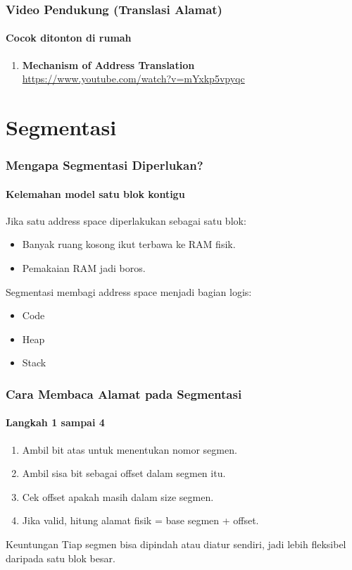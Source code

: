 \documentclass[t,aspectratio=169,xcolor=dvipsnames]{beamer}
\begin{document}
\begin{frame}
    \frametitle{Video Pendukung (Translasi Alamat)}
    \framesubtitle{Cocok ditonton di rumah}
    \small
    \begin{enumerate}
        \item \textbf{Mechanism of Address Translation}\\
        \scriptsize \url{https://www.youtube.com/watch?v=mYxkp5vpyqc}
    \end{enumerate}
\end{frame}

\section{Segmentasi}

\begin{frame}
    \frametitle{Mengapa Segmentasi Diperlukan?}
    \framesubtitle{Kelemahan model satu blok kontigu}
    \small
    Jika satu address space diperlakukan sebagai satu blok:
    \begin{itemize}
        \item Banyak ruang kosong ikut terbawa ke RAM fisik.
        \item Pemakaian RAM jadi boros.
    \end{itemize}

    Segmentasi membagi address space menjadi bagian logis:
    \begin{itemize}
        \item Code
        \item Heap
        \item Stack
    \end{itemize}
\end{frame}

\begin{frame}
    \frametitle{Cara Membaca Alamat pada Segmentasi}
    \framesubtitle{Langkah 1 sampai 4}
    \small
    \begin{enumerate}
        \item Ambil bit atas untuk menentukan nomor segmen.
        \item Ambil sisa bit sebagai offset dalam segmen itu.
        \item Cek offset apakah masih dalam size segmen.
        \item Jika valid, hitung alamat fisik = base segmen + offset.
    \end{enumerate}

    \begin{exampleblock}{Keuntungan}
        Tiap segmen bisa dipindah atau diatur sendiri, jadi lebih fleksibel daripada satu blok besar.
    \end{exampleblock}
\end{frame}
\end{document}
